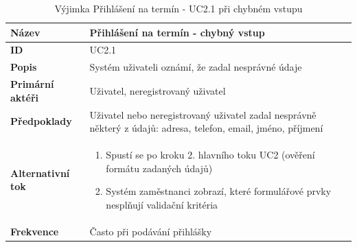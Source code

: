 \documentclass[12pt,a4paper,titlepage,final]{report}
\begin{document}
\begin{table}[!h]
	\begin{center}
    \begin{tabular}{ | p{4.2cm} | p{12.2cm} | }
    \hline
    \textbf{Název} & Přihlášení na termín - chybný vstup
    \\ \hline
    
	\textbf{ID} & UC2.1
	\\ \hline
	
	\textbf{Popis} & Systém uživateli oznámí, že zadal nesprávné údaje
	\\ \hline
	    
	\textbf{Primární aktéři} & Uživatel, neregistrovaný uživatel
	\\ \hline
	
	\textbf{Předpoklady} & Uživatel nebo neregistrovaný uživatel zadal nesprávně některý z údajů: adresa, telefon, email, jméno, příjmení
    \\ \hline
    
    \textbf{Alternativní tok} & 
    \vspace{-3.5mm}
    \begin{enumerate}
        \itemsep0em 
    	\item Spustí se po kroku 2. hlavního toku UC2 (ověření formátu zadaných údajů)
    	\item Systém zaměstnanci zobrazí, které formulářové prvky nesplňují validační kritéria
    \end{enumerate}
    \\ \hline              
    
	\textbf{Frekvence} & Často při podávání přihlášky
	\\ \hline
	\end{tabular}
		\caption{Výjimka Přihlášení na termín - UC2.1 při chybném vstupu}	
	\end{center}

\end{table}
\vspace{-0.5cm}
\end{document}
